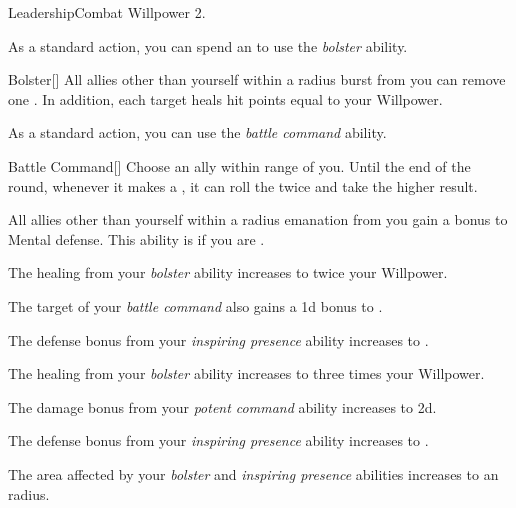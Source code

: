     \begin{feat}{Leadership}{Combat}
        \featpre Willpower 2.

         As a standard action, you can spend an  to use the \textit{bolster} ability.
        \begin{ability}{Bolster}[]
            All allies other than yourself within a \arealarge radius burst from you can remove one .
            In addition, each target heals hit points equal to your Willpower.
        \end{ability}

         As a standard action, you can use the \textit{battle command} ability.
        \begin{ability}{Battle Command}[]
            Choose an ally within \rngmed range of you.
            Until the end of the round, whenever it makes a , it can roll the  twice and take the higher result.
        \end{ability}

         All allies other than yourself within a \arealarge radius emanation from you gain a  bonus to Mental defense.
        This ability is  if you are .

         The healing from your \textit{bolster} ability increases to twice your Willpower.

         The target of your \textit{battle command} also gains a \plus1d bonus to .

         The defense bonus from your \textit{inspiring presence} ability increases to .

         The healing from your \textit{bolster} ability increases to three times your Willpower.

         The damage bonus from your \textit{potent command} ability increases to \plus2d.

         The defense bonus from your \textit{inspiring presence} ability increases to .

         The area affected by your \textit{bolster} and \textit{inspiring presence} abilities increases to an \areahuge radius.
    \end{feat}

